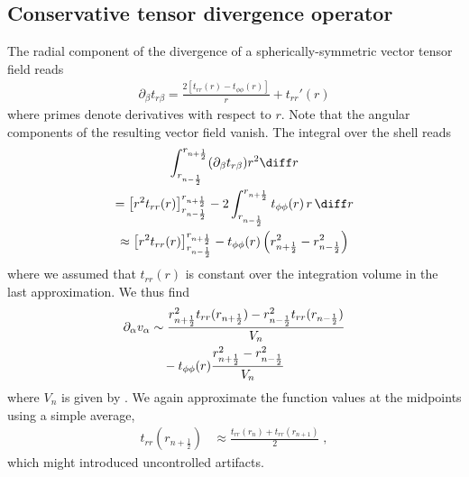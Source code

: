 \documentclass[
	superscriptaddress,
	twocolumn,
	aps, pre
]{revtex4-1}
\begin{document}
\subsection{Conservative tensor divergence operator}
The radial component of the divergence of a spherically-symmetric vector tensor field reads
\begin{align}
	\partial_\beta t_{r\beta} =
		\frac{2 \left[t_{rr}(r)-t_{\phi \phi }(r)\right]}{r}+t_{rr}'(r)
\end{align}
where primes denote derivatives with respect to $r$.
Note that the angular components of the resulting vector field vanish.
The integral over the shell reads
\begin{multline}
	\int_{r_{n-\frac12}}^{r_{n + \frac12}} (\partial_\beta t_{r\beta})  r^2 \diff r 
\\	
	 = \left[r^2 t_{rr}(r)\right]_{r_{n-\frac12}}^{r_{n + \frac12}}
	  - 2 \int_{r_{n-\frac12}}^{r_{n + \frac12}} t_{\phi \phi }(r) \, r \, \diff r 
\\
	 \approx \left[r^2 t_{rr}(r)\right]_{r_{n-\frac12}}^{r_{n + \frac12}}
	  - t_{\phi \phi }(r) \left(
	  	r_{n+\frac12}^2 - r_{n-\frac12}^2
	  \right)
\end{multline}
where we assumed that $t_{rr}(r)$ is constant over the integration volume in the last approximation.
We thus find
\begin{align}
	\partial_\alpha v_{\alpha} &\sim
	 \frac{r_{n + \frac12}^2 t_{rr}(r_{n + \frac12}) - r_{n - \frac12}^2 t_{rr}(r_{n - \frac12})}{V_n}
\\\notag & \quad - t_{\phi \phi }(r) \frac{r_{n+\frac12}^2 - r_{n-\frac12}^2}{V_n}
\end{align}
where $V_n$ is given by . 
We again approximate the function values at the midpoints using a simple average,
\begin{align}
	t_{rr}(r_{n + \frac12}) &\approx \frac{t_{rr}(r_{n}) + t_{rr}(r_{n+1})}{2}
	\;,
\end{align}
which might introduced uncontrolled artifacts.
\end{document}
